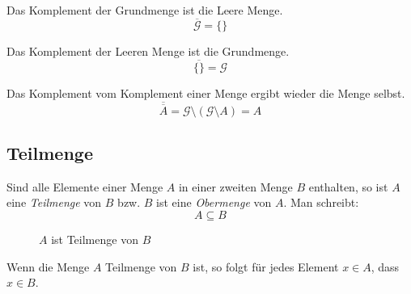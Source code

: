 \begin{folg}
 Das Komplement der Grundmenge ist die Leere Menge.
 \begin{equation*}
  \overline{\mathcal{G}} = \lbrace \rbrace
 \end{equation*}
\end{folg}

\begin{folg}
 Das Komplement der Leeren Menge ist die Grundmenge.
 \begin{equation*}
  \overline{\lbrace \rbrace} = \mathcal{G}
 \end{equation*}
\end{folg}

\begin{folg}
 Das Komplement vom Komplement einer Menge ergibt wieder die Menge selbst.
 \begin{equation*}
  \overline{\overline{A}} = \mathcal{G}\setminus (\mathcal{G}\setminus A) =  A
 \end{equation*}
\end{folg}

\subsection{Teilmenge}

\begin{defi}
Sind alle Elemente einer Menge \(A\) in einer zweiten Menge \(B\) enthalten, so ist \(A\) eine \emph{Teilmenge} von \(B\) bzw. \(B\) ist eine \emph{Obermenge} von \(A\).  Man schreibt:
\begin{equation*}
 A\subseteq B
\end{equation*}

 \begin{figure}
  \begin{center}
  \end{center}
  \caption{\(A\) ist Teilmenge von \(B\)}
 \end{figure}

 Wenn die Menge \(A\) Teilmenge von \(B\) ist, so folgt für jedes Element \(x\in A\), dass \(x\in B\).
\end{defi}

